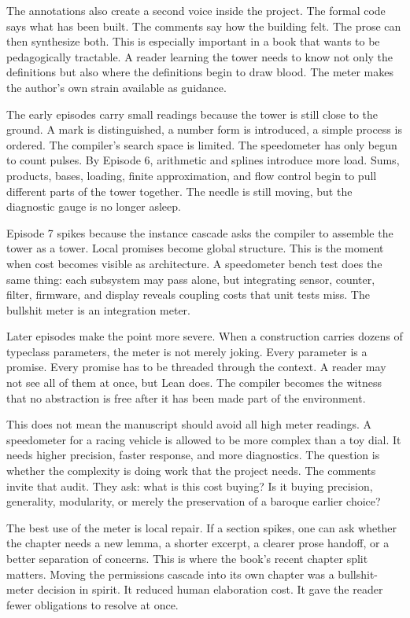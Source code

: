 The annotations also create a second voice inside the project. The formal code
says what has been built. The comments say how the building felt. The prose can
then synthesize both. This is especially important in a book that wants to be
pedagogically tractable. A reader learning the tower needs to know not only the
definitions but also where the definitions begin to draw blood. The meter makes
the author's own strain available as guidance.

The early episodes carry small readings because the tower is still close to
the ground. A mark is distinguished, a number form is introduced, a simple
process is ordered. The compiler's search space is limited. The speedometer has
only begun to count pulses. By Episode 6, arithmetic and splines introduce more
load. Sums, products, bases, loading, finite approximation, and flow control
begin to pull different parts of the tower together. The needle is still
moving, but the diagnostic gauge is no longer asleep.

Episode 7 spikes because the instance cascade asks the compiler to assemble
the tower as a tower. Local promises become global structure. This is the
moment when cost becomes visible as architecture. A speedometer bench test
does the same thing: each subsystem may pass alone, but integrating sensor,
counter, filter, firmware, and display reveals coupling costs that unit tests
miss. The bullshit meter is an integration meter.

Later episodes make the point more severe. When a construction carries dozens
of typeclass parameters, the meter is not merely joking. Every parameter is a
promise. Every promise has to be threaded through the context. A reader may
not see all of them at once, but Lean does. The compiler becomes the witness
that no abstraction is free after it has been made part of the environment.

This does not mean the manuscript should avoid all high meter readings. A
speedometer for a racing vehicle is allowed to be more complex than a toy dial.
It needs higher precision, faster response, and more diagnostics. The question
is whether the complexity is doing work that the project needs. The comments
invite that audit. They ask: what is this cost buying? Is it buying precision,
generality, modularity, or merely the preservation of a baroque earlier choice?

The best use of the meter is local repair. If a section spikes, one can ask
whether the chapter needs a new lemma, a shorter excerpt, a clearer prose
handoff, or a better separation of concerns. This is where the book's recent
chapter split matters. Moving the permissions cascade into its own chapter was
a bullshit-meter decision in spirit. It reduced human elaboration cost. It gave
the reader fewer obligations to resolve at once.


